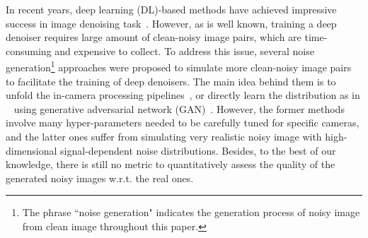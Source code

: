 \documentclass[runningheads]{llncs}
\begin{document}
In recent years, deep learning (DL)-based methods have achieved impressive success in image denoising
task~\cite{zhang2017beyond,anwar2019real,yue2019variational}. However, as is well known,
training a deep denoiser requires large amount of clean-noisy image pairs, which are time-consuming and expensive
to collect. To address this issue, several noise generation\footnote{ The phrase ``noise generation" indicates
the generation process of noisy image from clean image throughout this paper.}
approaches were proposed to simulate more clean-noisy image pairs to facilitate the training of deep denoisers. The main
idea behind them is to unfold the in-camera processing pipelines~\cite{guo2019toward,brooks2019unprocessing},
or directly learn the distribution  as in ~\cite{chen2018image,kim2019grdn} using generative adversarial
network (GAN)~\cite{goodfellow2014generative}.
However, the former methods involve many hyper-parameters needed to be carefully tuned for specific cameras,
and the latter ones suffer from simulating very realistic noisy image
with high-dimensional signal-dependent noise distributions.
Besides, to the best of our knowledge, there is still no metric to quantitatively assess the quality
of the generated noisy images w.r.t. the real ones.
\end{document}
